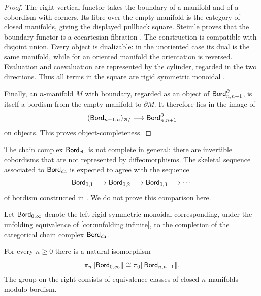 \documentclass[a4paper,11pt]{article}
\begin{document}
\begin{proof}
  The right vertical functor takes the boundary of a manifold and of
  a cobordism with corners.  Its fibre over the empty manifold is the
  category of closed manifolds, giving the displayed pullback square.
  Steimle proves that the boundary functor is a cocartesian fibration
  \cite[Lemma~4.4]{SteimleAdd}.  The construction is compatible with
  disjoint union.  Every object is dualizable: in the unoriented case
  its dual is the same manifold, while for an oriented manifold the
  orientation is reversed.  Evaluation and coevaluation are
  represented by the cylinder, regarded in the two directions.  Thus
  all terms in the square are rigid symmetric monoidal \icats{}.

  Finally, an $n$-manifold $M$ with boundary, regarded as an object of
  $\textup{\textsf{Bord}}^{\partial}_{n,n+1}$, is itself a bordism from the empty
  manifold to $\partial M$.  It therefore lies in the image of
  \[
    (\textup{\textsf{Bord}}_{n-1,n})_{\varnothing/}
      \longrightarrow \textup{\textsf{Bord}}^{\partial}_{n,n+1}
  \]
  on objects.  This proves object-completeness.
\end{proof}

\begin{remark}
  The chain complex $\textup{\textsf{Bord}}_{\mathrm{ch}}$ is not complete in general: there are
  invertible cobordisms that are not represented by diffeomorphisms.
  The skeletal sequence associated to $\textup{\textsf{Bord}}_{\mathrm{ch}}$ is expected to agree with
  the sequence
  \[
    \textup{\textsf{Bord}}_{0,1}\longrightarrow\textup{\textsf{Bord}}_{0,2}
      \longrightarrow\textup{\textsf{Bord}}_{0,3}\longrightarrow\cdots
  \]
  of bordism \incats{} constructed in \cite{CalaqueScheimbauer}.  We
  do not prove this comparison here.
\end{remark}

\begin{defn}\label{defn:geometric bordism unfolding}
  Let $\textup{\textsf{Bord}}_{0,\infty}$ denote the left rigid symmetric
  monoidal \iicat{} corresponding, under the unfolding equivalence of
  \cref{cor:unfolding infinite}, to the completion of the categorical
  chain complex $\textup{\textsf{Bord}}_{\mathrm{ch}}$.
\end{defn}

\begin{cor}\label{cor:geometric bordism localization}
  For every $n\geq0$ there is a natural isomorphism
  \[
    \pi_n\|\textup{\textsf{Bord}}_{0,\infty}\|
      \cong \pi_0\|\textup{\textsf{Bord}}_{n,n+1}\|.
  \]
  The group on the right consists of equivalence classes of closed
  $n$-manifolds modulo bordism.
\end{cor}
\end{document}
